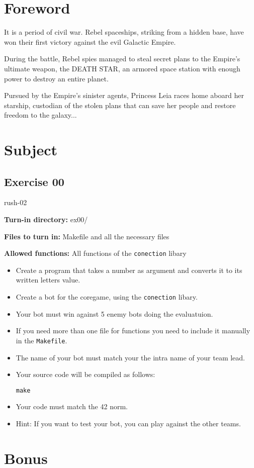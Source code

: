 \documentclass{article}
\begin{document}
\section{Foreword}

It is a period of civil war.
Rebel spaceships, striking from a
hidden base, have won their first
victory against the evil Galactic Empire.

During the battle, Rebel spies managed
to steal secret plans to the Empire's
ultimate weapon, the DEATH STAR,
an armored space station with enough
power to destroy an entire planet.

Pursued by the Empire's sinister agents,
Princess Leia races home aboard her starship,
custodian of the stolen plans that can save her
people and restore freedom to the galaxy...

\section{Subject}

\subsection{Exercise 00}
rush-02

\textbf{Turn-in directory:} ex00/

\textbf{Files to turn in:} Makefile and all the necessary files

\textbf{Allowed functions:} All functions of the \texttt{conection} libary

\begin{itemize}
    \item Create a program that takes a number as argument and converts it to its written letters value.
    
    \item Create a bot for the coregame, using the \texttt{conection} libary.
    
    \item Your bot must win against 5 enemy bots doing the evaluatuion.
    
    \item If you need more than one file for functions you need to include it manually in the \texttt{Makefile}.
    
    \item The name of your bot must match your the intra name of your team lead.
    
    \item Your source code will be compiled as follows:
    
    \begin{lstlisting}
make
    \end{lstlisting}
    
    \item Your code must match the 42 norm.
    
    \item Hint: If you want to test your bot, you can play against the other teams.
\end{itemize}

\section{Bonus}
\end{document}
